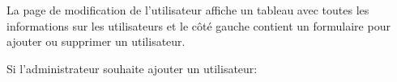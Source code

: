 \documentclass{article}
\begin{document}
\begin{enumerate}
  
  La page de modification de l'utilisateur affiche un tableau avec toutes les informations sur les utilisateurs et le côté gauche contient un formulaire pour ajouter ou supprimer un utilisateur.
  
  
  
  \vspace{0.7cm}
               \hspace*{-0.7in}
               \noindent{}
  
  
  Si l'administrateur souhaite ajouter un utilisateur:
  
  
   
  \vspace{0.7cm}
               \hspace*{-0.7in}
               \noindent{}
  

\end{enumerate}
\end{document}
